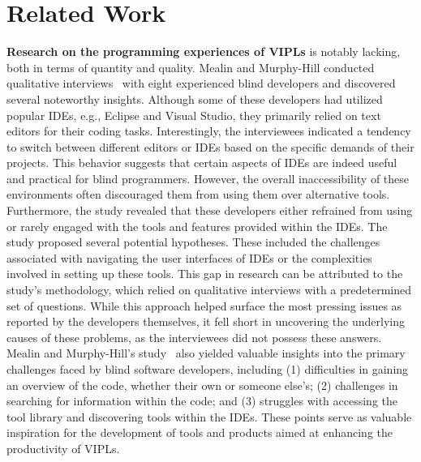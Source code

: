 \section{Related Work}
\label{sec:related}

{\bf Research on the programming experiences of VIPLs} is notably
lacking, both in terms of quantity and quality. Mealin and Murphy-Hill
conducted qualitative interviews~\cite{mealin-vhlcc12} with eight experienced blind
developers and discovered several noteworthy insights. Although some
of these developers had utilized popular IDEs, e.g., Eclipse and
Visual Studio, they primarily relied on text editors for their coding
tasks. Interestingly, the interviewees indicated a tendency to switch
between different editors or IDEs based on the specific demands of
their projects. This behavior suggests that certain aspects of IDEs
are indeed useful and practical for blind programmers. However, the
overall inaccessibility of these environments often discouraged them
from using them over alternative tools.
Furthermore, the study revealed that these developers either refrained
from using or rarely engaged with the tools and features provided
within the IDEs.
The study proposed several potential hypotheses. These included the
challenges associated with navigating the user interfaces of IDEs or
the complexities involved in setting up these tools. This gap in
research can be attributed to the study's methodology, which relied on
qualitative interviews with a predetermined set of questions. While
this approach helped surface the most pressing issues as reported by
the developers themselves, it fell short in uncovering the underlying
causes of these problems, as the interviewees did not possess these
answers.
Mealin and Murphy-Hill's study~\cite{mealin-vlhcc12} also yielded valuable insights into
the primary challenges faced by blind software developers, including
(1) difficulties in gaining an overview of the code, whether their own
or someone else's; (2) challenges in searching for information within
the code; and (3) struggles with accessing the tool library and
discovering tools within the IDEs. These points serve as valuable
inspiration for the development of tools and products aimed at
enhancing the productivity of VIPLs.

